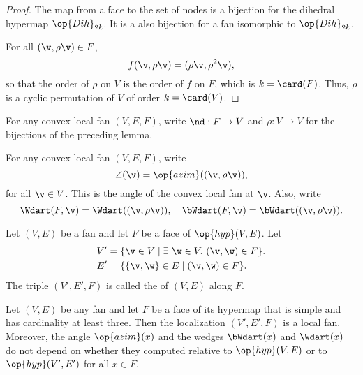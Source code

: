 \begin{proof} The map from a face to the set of nodes is a bijection
  for the dihedral hypermap $\op{Dih}_{2k}$. It is a also bijection
  for a fan isomorphic to $\op{Dih}_{2k}$.

For all $(\v,\rho \v)\in F$,
\[ 
f(\v,\rho \v) = (\rho\v,\rho^2\v),
\] 
so that the order of $\rho$ on $V$ is the order of $f$ on $F$, which
is $k=\card(F)$.  Thus, $\rho$ is a cyclic permutation of $V$ of order
$k=\card(V)$.
\end{proof}

\begin{definition}[$\rho$,~$\nd$] 
For any convex local fan $(V,E,F)$, write
$\nd:F\to V$ and $\rho:V\to V$ for the bijections of the preceding
lemma.
\end{definition}
%
%

\begin{definition}
For any convex local fan $(V,E,F)$,
write
\[ 
\angle(\v) = \op{azim}((\v,\rho\v)),
\] 
for all $\v\in V$.  This is the  angle of the convex
local fan at $\v$.  Also, write
\[ 
  \Wdart(F,\v) = \Wdart((\v,\rho \v)),\quad 
\bWdart(F,\v) =\bWdart((\v,\rho \v)).
\] 
%
%
%
\end{definition}


\begin{definition}[localization]
 Let $(V,E)$ be a fan and let $F$ be
a face of $\op{hyp}(V,E)$.  Let
\begin{align*}
V' &= \{\v\in V \mid \exists~\w\in V.~(\v,\w)\in F\}.\\
E' &= \{\{\v,\w\} \in E\mid (\v,\w)\in F\}.
\end{align*}
The triple $(V',E',F)$ is called the  of $(V,E)$ along $F$.
\end{definition}
%


\begin{lemma}[localization]%
\label{lemma:localization}
Let $(V,E)$ be any fan and let $F$ be a face of its hypermap that is
simple and has cardinality at least three.  Then the localization
$(V',E',F)$ is a local fan.  Moreover, the angle $\op{azim}(x)$ and
the wedges $\bWdart(x)$ and $\Wdart(x)$ do not depend on whether they
computed relative to $\op{hyp}(V,E)$ or to $\op{hyp}(V',E')$ for all
$x\in F$.
\end{lemma}



